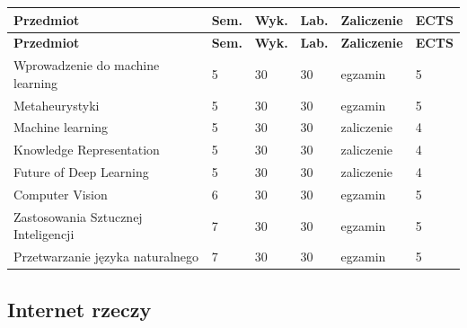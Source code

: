 \documentclass[12pt,a4paper]{article}
\newcommand{\thdrule}{\noalign{\global\setlength{\extrarowheight}{0pt}}}
\newcommand{\thdend}{\noalign{\global\setlength{\extrarowheight}{4pt}}}
\begin{document}
{\scriptsize
\begin{longtable}{m{6.5cm}m{0.7cm}m{1cm}m{1cm}m{1.7cm}m{0.7cm}}
\thdrule\toprule
\rowcolor{pjatkRed}
{\color{white}\footnotesize\textbf{\vphantom{Ag}Przedmiot}} & {\color{white}\footnotesize\textbf{\vphantom{Ag}Sem.}} & {\color{white}\footnotesize\textbf{\vphantom{Ag}Wyk.}} & {\color{white}\footnotesize\textbf{\vphantom{Ag}Lab.}} & {\color{white}\footnotesize\textbf{\vphantom{Ag}Zaliczenie}} & {\color{white}\footnotesize\textbf{\vphantom{Ag}ECTS}} \\
\midrule\thdend
\endfirsthead
\thdrule\toprule
\rowcolor{pjatkRed}
{\color{white}\footnotesize\textbf{\vphantom{Ag}Przedmiot}} & {\color{white}\footnotesize\textbf{\vphantom{Ag}Sem.}} & {\color{white}\footnotesize\textbf{\vphantom{Ag}Wyk.}} & {\color{white}\footnotesize\textbf{\vphantom{Ag}Lab.}} & {\color{white}\footnotesize\textbf{\vphantom{Ag}Zaliczenie}} & {\color{white}\footnotesize\textbf{\vphantom{Ag}ECTS}} \\
\midrule\thdend
\endhead
\rowcolor{tableRowLight} Wprowadzenie do machine learning & 5 & 30 & 30 & {\scriptsize egzamin} & 5 \\
\rowcolor{tableRowAlt} Metaheurystyki & 5 & 30 & 30 & {\scriptsize egzamin} & 5 \\
\rowcolor{tableRowLight} Machine learning & 5 & 30 & 30 & {\scriptsize zaliczenie} & 4 \\
\rowcolor{tableRowAlt} Knowledge Representation & 5 & 30 & 30 & {\scriptsize zaliczenie} & 4 \\
\rowcolor{tableRowLight} Future of Deep Learning & 5 & 30 & 30 & {\scriptsize zaliczenie} & 4 \\
\rowcolor{tableRowAlt} Computer Vision & 6 & 30 & 30 & {\scriptsize egzamin} & 5 \\
\rowcolor{tableRowLight} Zastosowania Sztucznej Inteligencji & 7 & 30 & 30 & {\scriptsize egzamin} & 5 \\
\rowcolor{tableRowAlt} Przetwarzanie języka naturalnego & 7 & 30 & 30 & {\scriptsize egzamin} & 5 \\
\bottomrule
\end{longtable}}

\subsection*{Internet rzeczy}
\end{document}
